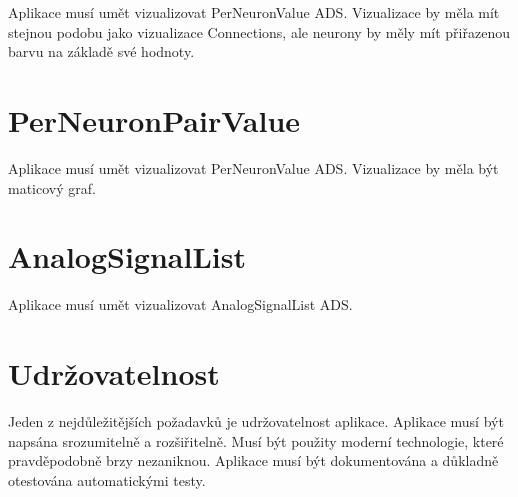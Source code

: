 Aplikace musí umět vizualizovat PerNeuronValue ADS. Vizualizace by měla mít stejnou podobu jako vizualizace Connections, ale neurony by měly mít přiřazenou barvu na základě své hodnoty.

\section{PerNeuronPairValue}

Aplikace musí umět vizualizovat PerNeuronValue ADS. Vizualizace by měla být maticový graf.

\section{AnalogSignalList}

Aplikace musí umět vizualizovat AnalogSignalList ADS.

\section{Udržovatelnost}

Jeden z nejdůležitějších požadavků je udržovatelnost aplikace. Aplikace musí být napsána srozumitelně a rozšiřitelně. Musí být použity moderní technologie, které pravděpodobně brzy nezaniknou. Aplikace musí být dokumentována a důkladně otestována automatickými testy.